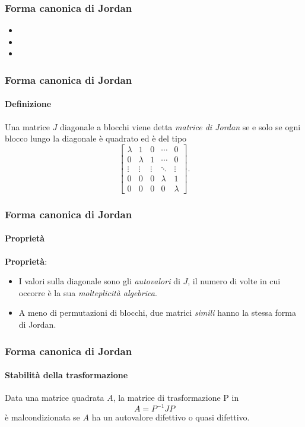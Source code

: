 \begin{frame}
	\frametitle{Forma canonica di Jordan}
	\begin{itemize}
		\item {}
		\item {}
		\item {}
	\end{itemize}
\end{frame}


\begin{frame}
	\frametitle{Forma canonica di Jordan}
	\framesubtitle{Definizione}
		\begin{definition}
			Una matrice $J$ diagonale a blocchi viene detta \emph{matrice di Jordan} se e solo se
			ogni blocco lungo la diagonale \`e quadrato ed \`e del tipo
			\[
				\begin{bmatrix}
					\lambda     &    1         &    0     &   \cdots   &    0    \\
						0       &    \lambda   &    1     &   \cdots   &    0    \\
					\vdots      &    \vdots    &  \vdots  &   \ddots   & \vdots  \\
						0       &       0      &     0    &  \lambda   &    1    \\
						0       &       0      &     0    &     0      & \lambda
				\end{bmatrix}.
			\]
		\end{definition}
\end{frame}


\begin{frame}
	\frametitle{Forma canonica di Jordan}
	\framesubtitle{Propriet\`a}
		\textbf{Propriet\`a}:
		\begin{itemize}
			\item<2-> I valori sulla diagonale sono gli \emph{autovalori} di $J$, il numero di volte
			in cui occorre \`e la sua \emph{molteplicit\`a algebrica}.
			\item<3-> A meno di permutazioni di blocchi, due matrici \emph{simili} hanno la
			stessa forma di Jordan.
		\end{itemize}
\end{frame}


\begin{frame}
	\frametitle{Forma canonica di Jordan}
	\framesubtitle{Stabilit\`a della trasformazione}
	Data una matrice quadrata $A$, la matrice di trasformazione P in
	\[A = P^{-1}JP\]
	\`e malcondizionata se $A$ ha un autovalore difettivo o quasi difettivo.
\end{frame}